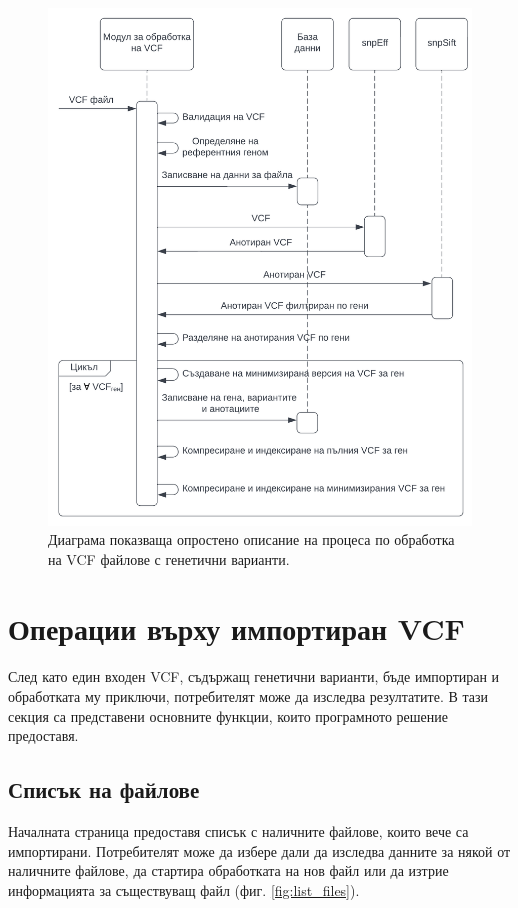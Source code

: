 \documentclass[pdftex,cyrillic,14pt,a4page,twoside,openright]{extreport}
\begin{document}
\begin{figure}[htp]
  \centering
  \includegraphics[width=16cm]{figures/vcf_processing_sequence}
  \caption {Диаграма показваща опростено описание на процеса по обработка на VCF файлове с генетични варианти.}
  \label{fig:vcf_processing_sequence}
\end{figure}

\section{Операции върху импортиран VCF}
\paragraph{}
След като един входен VCF, съдържащ генетични варианти, бъде импортиран и обработката му приключи, потребителят може да изследва резултатите. В тази секция са представени основните функции, които програмното решение предоставя.

\subsection{Списък на файлове}
Началната страница предоставя списък с наличните файлове, които вече са импортирани. Потребителят може да избере дали да изследва данните за някой от наличните файлове, да стартира обработката на нов файл или да изтрие информацията за съществуващ файл (фиг. \ref{fig:list_files}).
\end{document}
